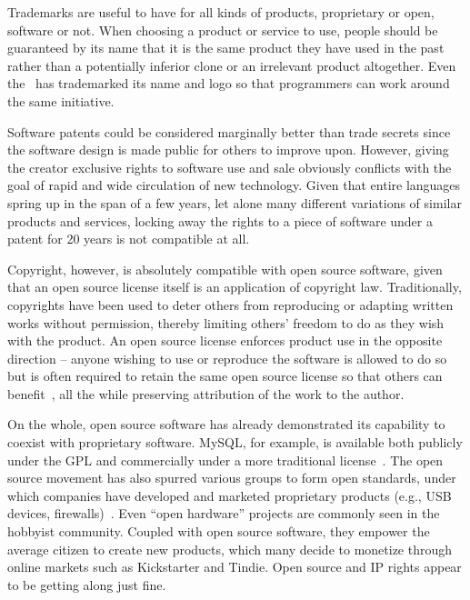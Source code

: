 \documentclass[12pt,letterpaper]{article}
\begin{document}
Trademarks are useful to have for all kinds of products, proprietary or open,
software or not. When choosing a product or service to use, people should be
guaranteed by its name that it is the same product they have used in the past
rather than a potentially inferior clone or an irrelevant product altogether.
Even the~\citet{osi2015} has trademarked its name and logo so that programmers
can work around the same initiative.

Software patents could be considered marginally better than trade secrets since
the software design is made public for others to improve upon. However, giving
the creator exclusive rights to software use and sale obviously conflicts with
the goal of rapid and wide circulation of new technology. Given that entire
languages spring up in the span of a few years, let alone many different
variations of similar products and services, locking away the rights to a piece
of software under a patent for 20 years is not compatible at all.

Copyright, however, is absolutely compatible with open source software, given
that an open source license itself is an application of copyright law.
Traditionally, copyrights have been used to deter others from reproducing or
adapting written works without permission, thereby limiting others' freedom to
do as they wish with the product. An open source license enforces product use
in the opposite direction -- anyone wishing to use or reproduce the software is
allowed to do so but is often required to retain the same open source license
so that others can benefit~\citep{osi2015}, all the while preserving
attribution of the work to the author.

On the whole, open source software has already demonstrated its capability to
coexist with proprietary software. MySQL, for example, is available both
publicly under the GPL and commercially under a more traditional
license~\citep[p. 2]{pugatch2008}. The open source movement has also spurred
various groups to form open standards, under which companies have developed and
marketed proprietary products (e.g., USB devices, firewalls)~\citep[p.
3]{pugatch2008}. Even ``open hardware'' projects are commonly seen in the
hobbyist community. Coupled with open source software, they empower the average
citizen to create new products, which many decide to monetize through online
markets such as Kickstarter and Tindie. Open source and IP rights appear to be
getting along just fine.



\end{document}
